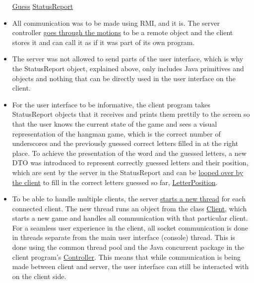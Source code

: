 \documentclass[a4paper]{scrartcl}
\begin{document}
\begin{itemize}
        \href{https://github.com/fongie/Hangman/blob/master/hangmanclient/src/main/java/DTO/Guess.java}{Guess} \href{https://github.com/fongie/Hangman/blob/master/hangmanserver/src/main/java/DTO/StatusReport.java}{StatusReport}
    
    \item All communication was to be made using RMI, and it is. The server controller \href{https://github.com/fongie/Filehandler/blob/master/filehandler_server/src/main/java/controller/ServerController.java#L18}{goes through the motions} to be a remote object and the client stores it and can call it as if it was part of its own program.
    
    \item The server was not allowed to send parts of the user interface, which is why the StatusReport object, explained above, only includes Java primitives and objects and nothing that can be directly used in the user interface on the client.
    
    \item For the user interface to be informative, the client program takes StatusReport objects that it receives and prints them prettily to the screen so that the user knows the current state of the game and sees a visual representation of the hangman game, which is the correct number of underscores and the previously guessed correct letters filled in at the right place. To achieve the presentation of the word and the guessed letters, a new DTO was introduced to represent correctly guessed letters and their position, which are sent by the server in the StatusReport and can be \href{https://github.com/fongie/Hangman/blob/50fc79c8c3e3d40953705370cbfbb7dee6867700/hangmanclient/src/main/java/view/UserInterface.java#L75}{looped over by the client} to fill in the correct letters guessed so far, \href{https://github.com/fongie/Hangman/blob/master/hangmanserver/src/main/java/DTO/LetterPosition.java}{LetterPosition}.
    
    \item To be able to handle multiple clients, the server \href{https://github.com/fongie/Hangman/blob/50fc79c8c3e3d40953705370cbfbb7dee6867700/hangmanserver/src/main/java/net/Server.java#L53}{starts a new thread} for each connected client. The new thread runs an object from the class \href{https://github.com/fongie/Hangman/blob/master/hangmanserver/src/main/java/net/Client.java}{Client}, which starts a new game and handles all communication with that particular client. For a seamless user experience in the client, all socket communication is done in threads separate from the main user interface (console) thread. This is done using the common thread pool and the Java concurrent package in the client program's \href{https://github.com/fongie/Hangman/blob/master/hangmanclient/src/main/java/contr/Controller.java}{Controller}. This means that while communication is being made between client and server, the user interface can still be interacted with on the client side.
    

\end{itemize}
\end{document}
